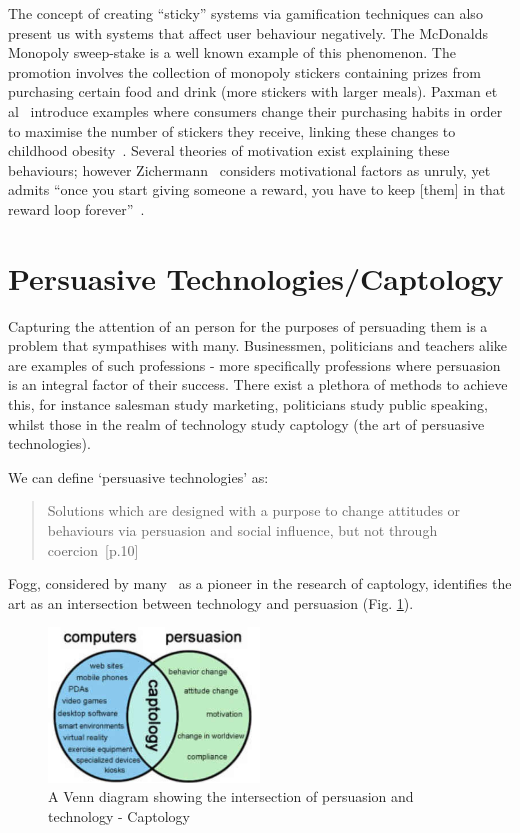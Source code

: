 The concept of creating ``sticky'' systems via gamification techniques can also present us with systems that affect user behaviour negatively. The McDonalds Monopoly sweep-stake is a well known example of this phenomenon. The promotion involves the collection of monopoly stickers containing prizes from purchasing certain food and drink (more stickers with larger meals). Paxman et al~\cite{mcdonalds} introduce examples where consumers change their purchasing habits in order to maximise the number of stickers they receive, linking these changes to childhood obesity~\cite{mcdonalds}. Several theories of motivation exist explaining these behaviours; however Zichermann~\cite{zichermann2011gamification} considers motivational factors as unruly, yet admits ``once you start giving someone a reward, you have to keep [them] in that reward loop forever''~\cite[p.~27]{zichermann2011gamification}.

\section{Persuasive Technologies/Captology}
Capturing the attention of an person for the purposes of persuading them is a problem that sympathises with many. Businessmen, politicians and teachers alike are examples of such professions - more specifically professions where persuasion is an integral factor of their success. There exist a plethora of methods to achieve this, for instance salesman study marketing, politicians study public speaking, whilst those in the realm of technology study captology (the art of persuasive technologies).

We can define `persuasive technologies' as:
\begin{quotation}
\noindent
Solutions which are designed with a purpose to change attitudes or behaviours via persuasion and social influence, but not through coercion~\cite{fogg}[p.10]
\end{quotation}

Fogg, considered by many~\cite{fogg1}\cite{fogg2} as a pioneer in the research of captology, identifies the art as an intersection between technology and persuasion (Fig. \ref{fig:captologyVenn}). 

\begin{figure}[H]
  \centering
    \includegraphics[width=0.5\textwidth]{img/captology-figure-3.png}
      \caption{A Venn diagram showing the intersection of persuasion and technology - Captology}
      \label{fig:captologyVenn}
\end{figure}

